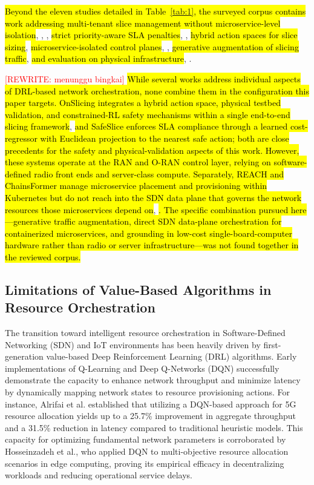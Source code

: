 \documentclass[conference]{IEEEtran}
\newcommand{\rev}[1]{\hl{#1}}
\begin{document}
\rev{Beyond the eleven studies detailed in Table~\ref{tab:1}, the surveyed corpus contains work addressing multi-tenant slice management without microservice-level isolation}\cite{b26}, \cite{b27}, \cite{b33}, \rev{strict priority-aware SLA penalties}\cite{b23}, \cite{b24}, \rev{hybrid action spaces for slice sizing}\cite{b28}, \rev{microservice-isolated control planes}\cite{b29}, \cite{b34}, \rev{generative augmentation of slicing traffic}\cite{b31}, \rev{and evaluation on physical infrastructure}\cite{b25}, \cite{b32}.

\textcolor{red}{[REWRITE: menunggu bingkai]} \rev{While several works address individual aspects of DRL-based network orchestration, none combine them in the configuration this paper targets. OnSlicing integrates a hybrid action space, physical testbed validation, and constrained-RL safety mechanisms within a single end-to-end slicing framework}\cite{b40}, \rev{and SafeSlice enforces SLA compliance through a learned cost-regressor with Euclidean projection to the nearest safe action}\cite{b41}\rev{; both are close precedents for the safety and physical-validation aspects of this work. However, these systems operate at the RAN and O-RAN control layer, relying on software-defined radio front ends and server-class compute. Separately, REACH and ChainsFormer manage microservice placement and provisioning within Kubernetes but do not reach into the SDN data plane that governs the network resources those microservices depend on}\cite{b47}, \cite{b48}\rev{. The specific combination pursued here---generative traffic augmentation, direct SDN data-plane orchestration for containerized microservices, and grounding in low-cost single-board-computer hardware rather than radio or server infrastructure---was not found together in the reviewed corpus.}

\subsection{Limitations of Value-Based Algorithms in Resource Orchestration}\label{sec:rw-value}

The transition toward intelligent resource orchestration in Software-Defined Networking (SDN) and IoT environments has been heavily driven by first-generation value-based Deep Reinforcement Learning (DRL) algorithms. Early implementations of Q-Learning and Deep Q-Networks (DQN) successfully demonstrate the capacity to enhance network throughput and minimize latency by dynamically mapping network states to resource provisioning actions. For instance, Alrifai et al. established that utilizing a DQN-based approach for 5G resource allocation yields up to a 25.7\% improvement in aggregate throughput and a 31.5\% reduction in latency compared to traditional heuristic models\cite{b14}. This capacity for optimizing fundamental network parameters is corroborated by Hosseinzadeh et al., who applied DQN to multi-objective resource allocation scenarios in edge computing, proving its empirical efficacy in decentralizing workloads and reducing operational service delays\cite{b15}.
\end{document}
